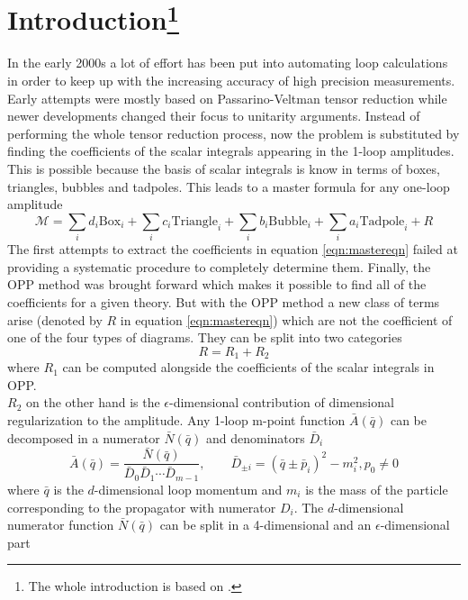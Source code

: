 \section{Introduction\footnote{The whole introduction is based on \cite{R2QCD,R2QED}.}}
\label{sec:Introduction} 
In the early 2000s a lot of effort has been put into automating loop calculations in order to keep up with the increasing accuracy of high precision measurements. Early attempts were mostly based on Passarino-Veltman tensor reduction while newer developments changed their focus to unitarity arguments. Instead of performing the whole tensor reduction process, now the problem is substituted by finding the coefficients of the scalar integrals appearing in the 1-loop amplitudes. This is possible because the basis of scalar integrals is know in terms of boxes, triangles, bubbles and tadpoles. This leads to a master formula for any one-loop amplitude 
\begin{equation}
\label{eqn:mastereqn}
\mathcal{M} = \sum_i d_i \mathrm{Box}_i + \sum_i c_i \mathrm{Triangle}_i + \sum_i b_i \mathrm{Bubble}_i + \sum_i a_i \mathrm{Tadpole}_i + R
\end{equation}
The first attempts to extract the coefficients in equation \ref{eqn:mastereqn} failed at providing a systematic procedure to completely determine them. Finally, the OPP method was brought forward which makes it possible to find all of the coefficients for a given theory. But with the OPP method a new class of terms arise (denoted by $R$ in equation \ref{eqn:mastereqn}) which are not the coefficient of one of the four types of diagrams. They can be split into two categories
\begin{equation}
R = R_1 + R_2
\end{equation}
where $R_1$ can be computed alongside the coefficients of the scalar integrals in OPP. \\
$R_2$ on the other hand is the $\epsilon$-dimensional contribution of dimensional regularization to the amplitude. Any 1-loop m-point function $\bar{A}(\bar{q})$ can be decomposed in a numerator $\bar{N}( \bar{q})$ and denominators $\bar{D}_i$
\begin{equation}
\label{eqn:amp}
\bar{A} (\bar{q}) = \frac{\bar{N}(\bar{q})}{\bar{D}_0\bar{D}_1\cdots\bar{D}_{m-1}}, \qquad \bar{D}_{\pm i} = \left( \bar{q} \pm \bar{p}_i \right)^2 - m_i^2, p_0 \neq 0
\end{equation}
where $\bar{q}$ is the $d$-dimensional loop momentum and $m_i$ is the mass of the particle corresponding to the propagator with numerator $D_i$. The $d$-dimensional numerator function $\bar{N}(\bar{q})$ can be split in a 4-dimensional and an $\epsilon$-dimensional part 
